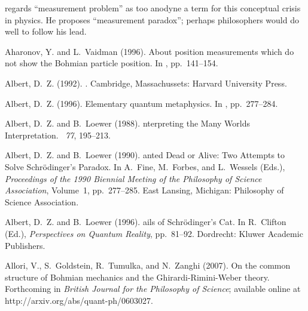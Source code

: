 \documentclass[12pt]{article}
\begin{document}
 regards ``measurement problem'' as too anodyne a term for this conceptual crisis in physics. He proposes ``measurement paradox''; perhaps philosophers would do well to follow his lead. 

\begin{thebibliography}{}

Aharonov, Y. and L.~Vaidman (1996).
\newblock About position measurements which do not show the {B}ohmian particle
  position.
\newblock In , pp.\  141--154.

Albert, D.~Z. (1992).
.
\newblock Cambridge, Massachussets: Harvard University Press.

Albert, D.~Z. (1996).
\newblock Elementary quantum metaphysics.
\newblock In , pp.\  277--284.

Albert, D.~Z. and B.~Loewer (1988).
nterpreting the {M}any {W}orlds {I}nterpretation.
~{\em 77}, 195--213.

Albert, D.~Z. and B.~Loewer (1990).
anted {D}ead or {A}live: {T}wo {A}ttempts to {S}olve
  {S}chr{\"o}dinger's {P}aradox.
\newblock In A.~Fine, M.~Forbes, and L.~Wessels (Eds.), {\em Proceedings of the
  1990 Biennial Meeting of the Philosophy of Science Association}, Volume~1,
  pp.\  277--285. East Lansing, Michigan: Philosophy of Science Association.

Albert, D.~Z. and B.~Loewer (1996).
ails of {S}chr{\"o}dinger's {C}at.
\newblock In R.~Clifton (Ed.), {\em Perspectives on Quantum Reality}, pp.\
  81--92. Dordrecht: Kluwer Academic Publishers.

\bibitem[\protect\citeauthoryear{Allori, Goldstein, Tumulka, and Zanghi}{Allori
  et~al.}{2007}]{goldsteinontology}
Allori, V., S.~Goldstein, R.~Tumulka, and N.~Zanghi (2007).
\newblock On the common structure of {B}ohmian mechanics and the
  {G}hirardi-{R}imini-{W}eber theory.
\newblock Forthcoming in \emph{British Journal for the Philosophy of Science};
  available online at http://arxiv.org/abs/quant-ph/0603027.


\end{thebibliography}
\end{document}
